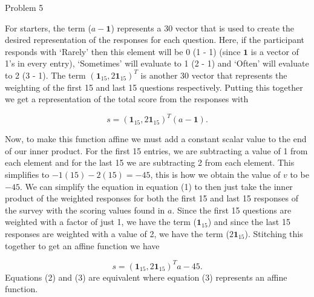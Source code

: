 \begin{problem}{Problem 5}
\begin{Highlight}[Solution]
        For starters, the term ($a-\mathbf{1}$) represents a 30 vector that is used to create the desired representation of the responses for each question. Here, if the participant responds with `Rarely' 
        then this element will be 0 (1 - 1) (since $\mathbf{1}$ is a vector of 1's in every entry), `Sometimes' will evaluate to 1 (2 - 1) and `Often' will evaluate to 2 (3 - 1). The term $(\mathbf{1}_{15},2\mathbf{1}_{15})^{T}$
        is another 30 vector that represents the weighting of the first 15 and last 15 questions respectively. Putting this together we get a representation of the total score from the responses with

        \begin{equation}
            s = (\mathbf{1}_{15},2\mathbf{1}_{15})^{T}(a-\mathbf{1}).
        \end{equation}
        
        Now, to make this function affine we must add a constant scalar value to the end of our inner product. For the first 15 entries, we are subtracting a value of 1 from each element and for the last 
        15 we are subtracting 2 from each element. This simplifies to $-1(15) - 2(15) = -45$, this is how we obtain the value of $v$ to be $-45$. We can simplify the equation in equation (1) to then just 
        take the inner product of the weighted responses for both the first 15 and last 15 responses of the survey with the scoring values found in $a$. Since the first 15 questions are weighted with a factor
        of just 1, we have the term ($\mathbf{1}_{15}$) and since the last 15 responses are weighted with a value of 2, we have the term ($2\mathbf{1}_{15}$). Stitching this together to get an affine function
        we have

        \begin{equation}
            s = (\mathbf{1}_{15},2\mathbf{1}_{15})^{T}a - 45.
        \end{equation}
        Equations (2) and (3) are equivalent where equation (3) represents an affine function.
    \end{Highlight}
\end{problem}

